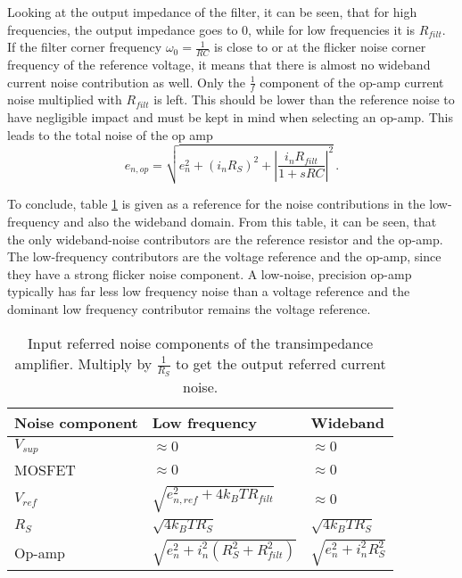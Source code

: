 Looking at the output impedance of the filter, it can be seen, that for high frequencies, the output impedance goes to \num{0}, while for low frequencies it is $R_{filt}$. If the filter corner frequency $\omega_0 = \frac{1}{RC}$ is close to or at the flicker noise corner frequency of the reference voltage, it means that there is almost no wideband current noise contribution as well. Only the $\frac{1}{f}$ component of the op-amp current noise multiplied with $R_{filt}$ is left. This should be lower than the reference noise to have negligible impact and must be kept in mind when selecting an op-amp.
This leads to the total noise of the op amp
\begin{equation}
    e_{n,op} = \sqrt{e_n^2 + (i_n R_S)^2 + \left|\frac{i_n R_{filt}}{1+sRC}\right|^2} \,.
\end{equation}

To conclude, table \ref{tab:current_source_noise_contributers} is given as a reference for the noise contributions in the low-frequency and also the wideband domain. From this table, it can be seen, that the only wideband-noise contributors are the reference resistor and the op-amp. The low-frequency contributors are the voltage reference and the op-amp, since they have a strong flicker noise component. A low-noise, precision op-amp typically has far less low frequency noise than a voltage reference and the dominant low frequency contributor remains the voltage reference.

\begin{table}[ht]
    \centering
    \begin{tabular}{lll}
        \toprule
        Noise component& Low frequency& Wideband \\
        \midrule
        $V_{sup}$ & $\approx 0$ & $\approx 0$\\
        MOSFET & $\approx 0$ & $\approx 0$\\
        $V_{ref}$ & $\sqrt{e_{n,ref}^2 + 4 k_B T R_{filt}} $ & $\approx 0$\\
        $R_S$ & $\sqrt{4 k_B T R_S}$ & $\sqrt{4 k_B T R_S}$\\
        Op-amp & $\sqrt{e_n^2 + i_n^2 (R_S^2 + R_{filt}^2)}$ & $\sqrt{e_n^2 + i_n^2 R_S^2}$\\
        \bottomrule
    \end{tabular}
    \caption{Input referred noise components of the transimpedance amplifier. Multiply by $\frac{1}{R_S}$ to get the output referred current noise.}
    \label{tab:current_source_noise_contributers}
\end{table}

